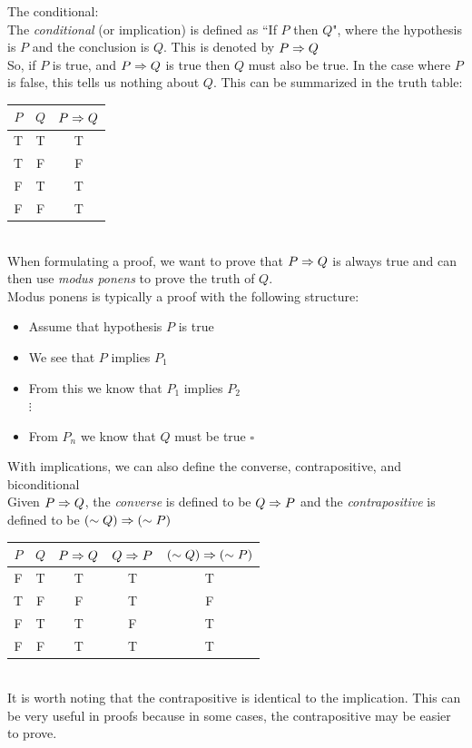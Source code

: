 \documentclass[11pt, fleqn]{article}
\begin{document}
The conditional:\\
The \textit{conditional} (or implication) is defined as ``If $P$ then $Q$", where the hypothesis is $P$ and the conclusion is $Q$. This is denoted by $P\Rightarrow Q$\\
So, if $P$ is true, and $P\Rightarrow Q$ is true then $Q$ must also be true. In the case where $P$ is false, this tells us nothing about $Q$. This can be summarized in the truth table:\\
\begin{tabular}{c|c|c}
    $P$ & $Q$ & $P\Rightarrow Q$\\
    \hline
    T & T & T\\
    T & F & F\\
    F & T & T\\
    F & F & T
\end{tabular}\\
When formulating a proof, we want to prove that $P\Rightarrow Q$ is always true and can then use \textit{modus ponens} to prove the truth of $Q$.\\
Modus ponens is typically a proof with the following structure:
\begin{itemize}
    \item Assume that hypothesis $P$ is true
    \item We see that $P$ implies $P_1$
    \item From this we know that $P_1$ implies $P_2$\\
    $\vdots$
    \item From $P_n$ we know that $Q$ must be true $\square$
\end{itemize}
With implications, we can also define the converse, contrapositive, and biconditional\\
Given $P\Rightarrow Q$, the \textit{converse} is defined to be $Q\Rightarrow P$ and the \textit{contrapositive} is defined to be $(\sim Q)\Rightarrow (\sim P)$\\
\begin{tabular}{c|c||c|c|c}
    $P$ & $Q$ & $P\Rightarrow Q$ & $Q\Rightarrow P$ & $(\sim Q)\Rightarrow (\sim P)$\\
    \hline
    F & T & T & T & T\\
    T & F & F & T & F\\
    F & T & T & F & T\\
    F & F & T & T & T
\end{tabular}\\
It is worth noting that the contrapositive is identical to the implication. This can be very useful in proofs because in some cases, the contrapositive may be easier to prove.\\
\end{document}
